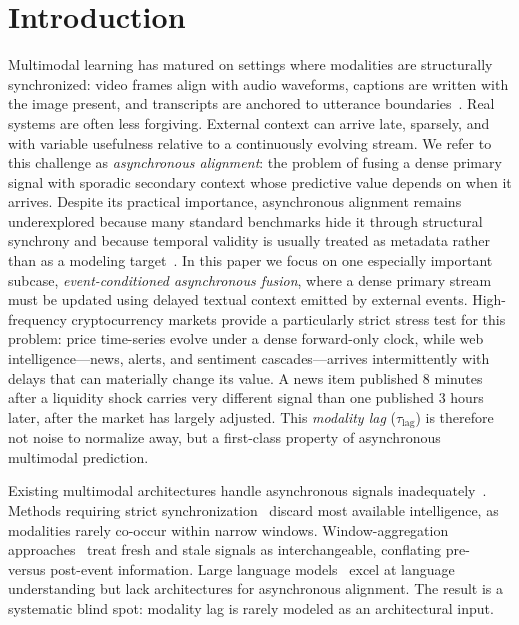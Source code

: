 \section{Introduction}
\label{sec:intro}

Multimodal learning has matured on settings where modalities are structurally synchronized: video frames align with audio waveforms, captions are written with the image present, and transcripts are anchored to utterance boundaries~\cite{baltrusaitis2019multimodal,tsai2019multimodal}.
Real systems are often less forgiving.
External context can arrive late, sparsely, and with variable usefulness relative to a continuously evolving stream.
We refer to this challenge as \emph{asynchronous alignment}: the problem of fusing a dense primary signal with sporadic secondary context whose predictive value depends on when it arrives.
Despite its practical importance, asynchronous alignment remains underexplored because many standard benchmarks hide it through structural synchrony and because temporal validity is usually treated as metadata rather than as a modeling target~\cite{baltrusaitis2019multimodal,dasgupta2018hyte,liu2021temporal}.
In this paper we focus on one especially important subcase, \emph{event-conditioned asynchronous fusion}, where a dense primary stream must be updated using delayed textual context emitted by external events.
High-frequency cryptocurrency markets provide a particularly strict stress test for this problem: price time-series evolve under a dense forward-only clock, while web intelligence---news, alerts, and sentiment cascades---arrives intermittently with delays that can materially change its value.
A news item published 8 minutes after a liquidity shock carries very different signal than one published 3 hours later, after the market has largely adjusted.
This \emph{modality lag} ($\tau_{\mathrm{lag}}$) is therefore not noise to normalize away, but a first-class property of asynchronous multimodal prediction.

Existing multimodal architectures handle asynchronous signals inadequately~\cite{baltrusaitis2019multimodal,tsai2019multimodal}.
Methods requiring strict synchronization~\cite{sawhney2020multimodal,qin2019mdrm} discard most available intelligence, as modalities rarely co-occur within narrow windows.
Window-aggregation approaches~\cite{xu2018stocknet,ding2015deepevent} treat fresh and stale signals as interchangeable, conflating pre- versus post-event information.
Large language models~\cite{lopez2023fingpt,wu2023bloomberggpt} excel at language understanding but lack architectures for asynchronous alignment.
The result is a systematic blind spot: modality lag is rarely modeled as an architectural input.

